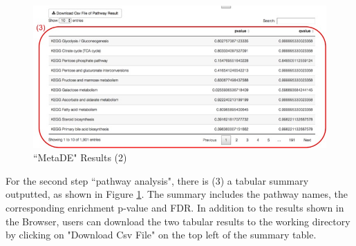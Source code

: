 \begin{figure}[H]
\begin{center}
\includegraphics[scale=0.45]{./figure/metaDE/metaDEresult2.jpg}
\caption{``MetaDE" Results (2)}
\label{fig:MetaDEresult2}
\end{center}
\end{figure}

For the second step ``pathway analysis", there is (3) a tabular summary outputted, as shown in Figure \ref{fig:MetaDEresult2}. The summary includes the pathway names, the corresponding enrichment p-value and FDR. 
In addition to the results shown in the Browser, users can download the two tabular results to the working directory by clicking on "Download Csv File" on the top left of the summary table. 

